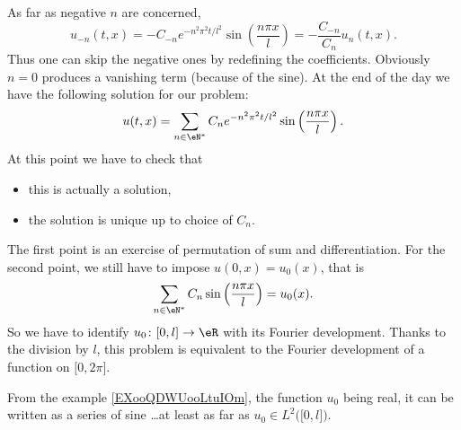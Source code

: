As far as negative \( n\) are concerned,
\begin{equation}
    u_{-n}(t,x)=-C_{-n} e^{-n^2\pi^2 t/l^2}\sin\left( \frac{ n\pi x }{ l } \right)=-\frac{ C_{-n} }{C_n  }u_n(t,x).
\end{equation}
Thus one can skip the negative ones by redefining the coefficients. Obviously \( n=0\) produces a vanishing term (because of the sine). At the end of the day we have the following solution for our problem:
\begin{equation}
    u(t,x)=\sum_{n\in \eN^*}C_n e^{-n^2\pi^2 t/l^2}\sin\left( \frac{ n\pi x }{ l } \right).
\end{equation}
At this point we have to check that
\begin{itemize}
    \item this is actually a solution,
    \item the solution is unique up to choice of \( C_n\).
\end{itemize}
The first point is an exercise of permutation of sum and differentiation. For the second point, we still have to impose \( u(0,x)=u_0(x)\), that is
\begin{equation}
    \sum_{n\in \eN^*}C_n\sin\left( \frac{ n\pi x }{ l } \right)=u_0(x).
\end{equation}
So we have to identify \( u_0\colon  \mathopen[ 0 , l \mathclose]\to \eR \) with its Fourier development. Thanks to the division by \( l\), this problem is equivalent to the Fourier development of a function on \( \mathopen[ 0 , 2\pi \mathclose]\).

From the example \ref{EXooQDWUooLtuIOm}, the function \( u_0\) being real, it can be written as a series of sine \ldots at least as far as \( u_0\in L^2\big( \mathopen[ 0 , l \mathclose] \big)\).
